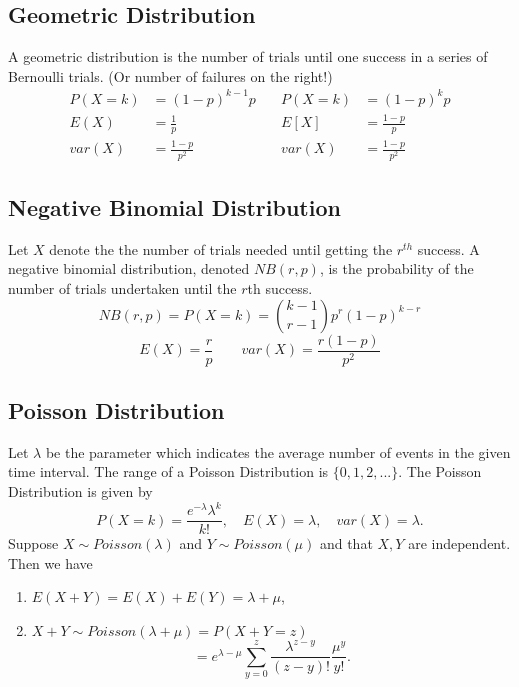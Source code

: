 \documentclass[11pt, twocolumn]{article}
\date{}
\theoremstyle{definition}
\begin{document}
\small

\subsection*{Geometric Distribution}
A geometric distribution is the number of trials until one success in a series of Bernoulli trials. (Or number of failures on the right!)
\begin{align*}
P(X=k)&=(1-p)^{k-1}p  \quad &P(X=k)&=(1-p)^kp\\
E(X)&=\frac{1}{p}  &E[X]&=\frac{1-p}{p}\\
var(X)&=\frac{1-p}{p^2}  &var(X)&=\frac{1-p}{p^2}
\end{align*}



\subsection*{Negative Binomial Distribution}
Let $X$ denote the the number of trials needed until getting the $r^{th}$ success. A negative binomial distribution, denoted $NB(r,p)$, is the probability of the number of trials undertaken until the $r$th success.
\begin{equation*}
NB(r,p)=P(X=k)=\binom{k-1}{r-1}p^r(1-p)^{k-r}
\end{equation*}
\begin{equation*}
E(X)=\frac{r}{p} \qquad var(X)=\frac{r(1-p)}{p^2}
\end{equation*}



\subsection*{Poisson Distribution}
Let  $\lambda$ be the parameter which indicates the average number of events in the given time interval. The range of a Poisson Distribution is $\{0,1,2,...\}$. The Poisson Distribution is given by
\[ P(X=k)=\frac{e^{-\lambda}\lambda^k}{k!}, \quad E(X)=\lambda, \quad var(X)=\lambda. \]
Suppose $X \sim Poisson(\lambda)$ and $Y \sim Poisson(\mu)$ and that $X,Y$ are independent. Then we have 
\begin{enumerate}
\item $E(X+Y)=E(X)+E(Y)=\lambda + \mu$,
\item $X+Y \sim Poisson(\lambda + \mu)=P(X+Y=z)$
\[=e^{\lambda - \mu} \sum_{y=0}^z \frac{\lambda^{z-y}}{(z-y)!}\frac{\mu^y}{y!}.\]
\end{enumerate}
\end{document}
